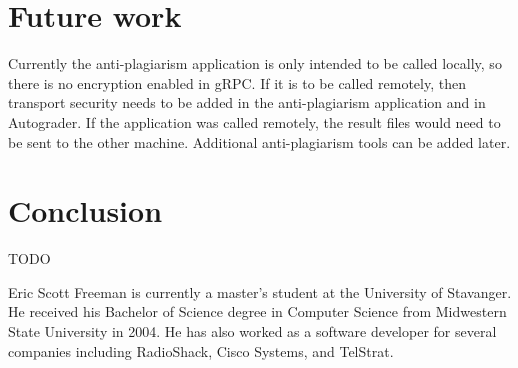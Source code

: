 \documentclass[journal,comsoc]{IEEEtran}
\begin{document}
	\section{Future work}
	Currently the anti-plagiarism application is only intended to be called locally, so there is no encryption enabled in gRPC. If it is to be called remotely, then transport security needs to be added in the anti-plagiarism application and in Autograder. If the application was called remotely, the result files would need to be sent to the other machine. Additional anti-plagiarism tools can be added later.
	
	\section{Conclusion}
	TODO
	
	
	

\begin{IEEEbiographynophoto}{Eric Scott Freeman}
is currently a master's student at the University of Stavanger. He received his Bachelor of Science degree in Computer Science from Midwestern State University in 2004. He has also worked as a software developer for several companies including RadioShack, Cisco Systems, and TelStrat.
\end{IEEEbiographynophoto}
\end{document}
